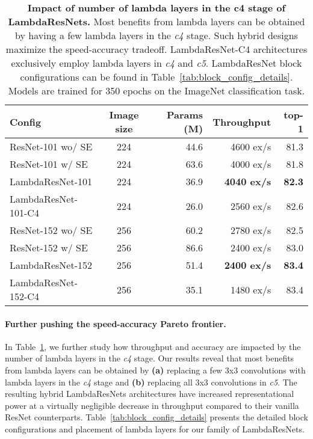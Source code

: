 \documentclass{article} \usepackage{iclr2021_conference,times}
\begin{document}
\begin{table}[h]
  \begin{center}
  \small
  \begin{tabular}{lcrrr}
    \toprule
    Config & Image size & Params (M) & Throughput & top-1 \\
\midrule
    ResNet-101 wo/ SE & 224 & 44.6 & 4600 ex/s & 81.3 \\
    ResNet-101 w/ SE & 224 & 63.6 & 4000 ex/s & 81.8 \\
    LambdaResNet-101 & 224 & 36.9 & \textbf{4040 ex/s} & \textbf{82.3} \\
    LambdaResNet-101-C4 & 224 & 26.0 & 2560 ex/s & 82.6 \\
\midrule
    ResNet-152 wo/ SE & 256 & 60.2 & 2780 ex/s & 82.5 \\
    ResNet-152 w/ SE & 256 & 86.6 & 2400 ex/s & 83.0 \\
    LambdaResNet-152 & 256 & 51.4 & \textbf{2400 ex/s} & \textbf{83.4} \\
    LambdaResNet-152-C4 & 256 & 35.1 & 1480 ex/s & 83.4 \\
    \bottomrule
  \end{tabular}
  \caption{
  \textbf{Impact of number of lambda layers in the c4 stage of LambdaResNets.} 
  Most benefits from lambda layers can be obtained by having a few lambda layers in the \emph{c4} stage. 
  Such hybrid designs maximize the speed-accuracy tradeoff.
  LambdaResNet-C4 architectures exclusively employ lambda layers in \emph{c4} and \emph{c5}.
  LambdaResNet block configurations can be found in Table~\ref{tab:block_config_details}.
  Models are trained for 350 epochs on the ImageNet classification task.
  }
  \label{tab:c4_hybrid}
\end{center}
\end{table}

\vspace{-0.1cm}
\paragraph{Further pushing the speed-accuracy Pareto frontier.}
In Table~\ref{tab:c4_hybrid}, we further study how throughput and accuracy are impacted by the number of lambda layers in the \emph{c4} stage.
Our results reveal that most benefits from lambda layers can be obtained by \textbf{(a)} replacing a few 3x3 convolutions with lambda layers in the \emph{c4} stage and \textbf{(b)} replacing all 3x3 convolutions in \emph{c5}.
The resulting hybrid LambdaResNets architectures have increased representational power at a virtually negligible decrease in throughput compared to their vanilla ResNet counterparts.
Table~\ref{tab:block_config_details} presents the detailed block configurations and placement of lambda layers for our family of LambdaResNets.
\end{document}
